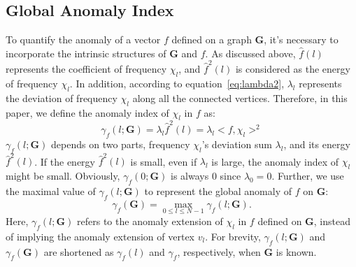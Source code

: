 \documentclass[twoside,leqno,twocolumn]{article}
\begin{document}
\subsection{Global Anomaly Index}
\label{sec:signal_anomaly_on_Graph}

To quantify the anomaly of a vector $f$ defined on a graph $\mathbf{G}$, it's necessary to incorporate the intrinsic structures of $\mathbf{G}$ and $f$. As discussed above, $\hat{f}(l)$ represents the coefficient of frequency $\chi_l$, and $\hat{f}^2(l)$ is considered as the energy of frequency $\chi_l$. In addition, according to equation~\ref{eq:lambda2}, $\lambda_l$ represents the deviation of frequency $\chi_l$ along all the connected vertices. Therefore, in this paper, we define the anomaly index of $\chi_l$ in $f$ as:
\begin{equation}
\label{eq:lambda3}
\gamma_f(l;\mathbf{G})=\lambda_l\hat{f}^2(l)= \lambda_l<f,\chi_l>^2
\end{equation}
$\gamma_f(l;\mathbf{G})$ depends on two parts, frequency $\chi_l$'s deviation sum $\lambda_l$, and its energy $\hat{f}^2(l)$. If the energy $\hat{f}^2(l)$ is small, even if $\lambda_l$ is large, the anomaly index of $\chi_l$ might be small. Obviously, $\gamma_f(0;\mathbf{G})$ is always $0$ since $\lambda_0=0$. Further, we use the maximal value of $\gamma_f(l;\mathbf{G})$ to represent the global anomaly of $f$ on $\mathbf{G}$:
\begin{equation}
\label{eq:lambda4}
\gamma_f(\mathbf{G})=\underset{0 \leq l \leq N-1}{\max}{\gamma_f(l;\mathbf{G})}.
\end{equation}
Here, $\gamma_f(l;\mathbf{G})$ refers to the anomaly extension of $\chi_l$ in $f$ defined on $\mathbf{G}$, instead of implying the anomaly extension of vertex $v_l$.
For brevity, $\gamma_f(l;\mathbf{G})$  and $\gamma_f(\mathbf{G})$ are shortened as $\gamma_f(l)$ and $\gamma_f$, respectively, when $\mathbf{G}$ is known.
\end{document}
